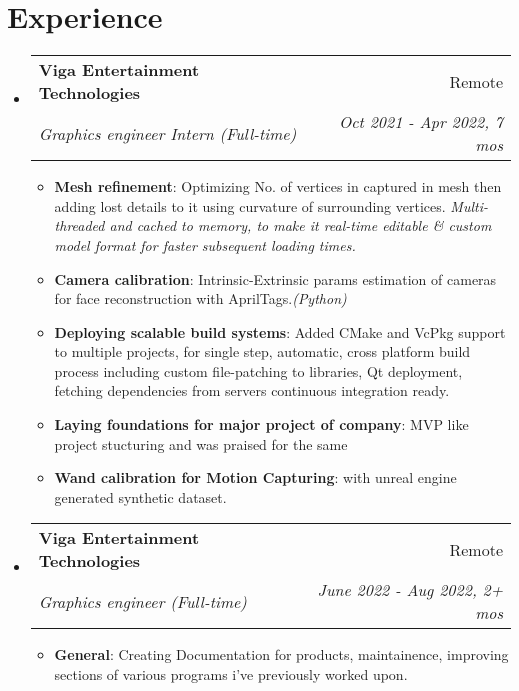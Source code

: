 \documentclass[a4paper,10pt]{article}
\makeatletter
\newcommand{\resumeItem}[2]{
  \item\small{
    \textbf{#1}{: #2 \vspace{-2pt}}
  }
}
\newcommand{\resumeSubheading}[4]{
  \vspace{-1pt}\item
    \begin{tabular*}{0.97\textwidth}{l@{\extracolsep{\fill}}r}
      \textbf{#1} & #2 \\
      \textit{#3} & \textit{#4} \\
    \end{tabular*}\vspace{-5pt}
}
\newcommand{\resumeSubHeadingListStart}{\begin{itemize}[leftmargin=*]}
\newcommand{\resumeSubHeadingListEnd}{\end{itemize}}
\newcommand{\resumeItemListStart}{\begin{itemize}}
\newcommand{\resumeItemListEnd}{\end{itemize}\vspace{-5pt}}
\makeatother
\begin{document}
\section{Experience}
  \resumeSubHeadingListStart
    \resumeSubheading{Viga Entertainment Technologies}{Remote}
    {Graphics engineer Intern (Full-time)}{Oct 2021 - Apr 2022, 7 mos}
    \resumeItemListStart
        \resumeItem{Mesh refinement}
          {Optimizing No. of vertices in captured in mesh then adding lost details to it using curvature of surrounding vertices. \textit{Multi-threaded and cached to memory, to make it real-time editable \& custom model format for faster subsequent loading times.}}
        \resumeItem{Camera calibration}
          {Intrinsic-Extrinsic params estimation of cameras for face reconstruction with AprilTags.\textit{(Python)}}
        \resumeItem{Deploying scalable build systems}
          {Added CMake and VcPkg support to multiple projects, for single step, automatic, cross platform build process including custom file-patching to libraries, Qt deployment, fetching dependencies from servers continuous integration ready.}
        \resumeItem{Laying foundations for major project of company}
          {MVP like project stucturing and was praised for the same}
        \resumeItem{Wand calibration for Motion Capturing}{with unreal engine generated synthetic dataset.}
      \resumeItemListEnd
    \resumeSubheading{Viga Entertainment Technologies}{Remote}
    {Graphics engineer (Full-time)}{June 2022 - Aug 2022, 2+ mos}
      \resumeItemListStart
        \resumeItem{General}{Creating Documentation for products, maintainence, improving sections of various programs i've previously worked upon.}
      \resumeItemListEnd
\resumeSubHeadingListEnd

\vspace{-7pt}
\end{document}
